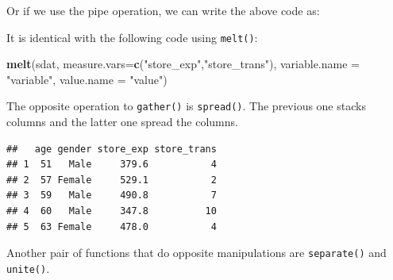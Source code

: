 \documentclass[12pt,]{krantz}
\newenvironment{Shaded}{\begin{snugshade}}{\end{snugshade}}
\newcommand{\KeywordTok}[1]{\textcolor[rgb]{0.13,0.29,0.53}{\textbf{#1}}}
\newcommand{\DataTypeTok}[1]{\textcolor[rgb]{0.13,0.29,0.53}{#1}}
\newcommand{\StringTok}[1]{\textcolor[rgb]{0.31,0.60,0.02}{#1}}
\newcommand{\OperatorTok}[1]{\textcolor[rgb]{0.81,0.36,0.00}{\textbf{#1}}}
\newcommand{\NormalTok}[1]{#1}
\theoremstyle{definition}
\theoremstyle{definition}
\theoremstyle{definition}
\theoremstyle{remark}
\begin{document}
Or if we use the pipe operation, we can write the above code as:

\begin{Shaded}
\end{Shaded}

It is identical with the following code using \texttt{melt()}:

\begin{Shaded}
\begin{Highlighting}[]
\KeywordTok{melt}\NormalTok{(sdat, }\DataTypeTok{measure.vars=}\KeywordTok{c}\NormalTok{(}\StringTok{"store_exp"}\NormalTok{,}\StringTok{"store_trans"}\NormalTok{),}
            \DataTypeTok{variable.name =} \StringTok{"variable"}\NormalTok{,}
              \DataTypeTok{value.name =} \StringTok{"value"}\NormalTok{)}
\end{Highlighting}
\end{Shaded}

The opposite operation to \texttt{gather()} is \texttt{spread()}. The
previous one stacks columns and the latter one spread the columns.

\begin{Shaded}
\end{Shaded}

\begin{verbatim}
##   age gender store_exp store_trans
## 1  51   Male     379.6           4
## 2  57 Female     529.1           2
## 3  59   Male     490.8           7
## 4  60   Male     347.8          10
## 5  63 Female     478.0           4
\end{verbatim}

Another pair of functions that do opposite manipulations are
\texttt{separate()} and \texttt{unite()}.

\begin{Shaded}
\end{Shaded}
\end{document}
